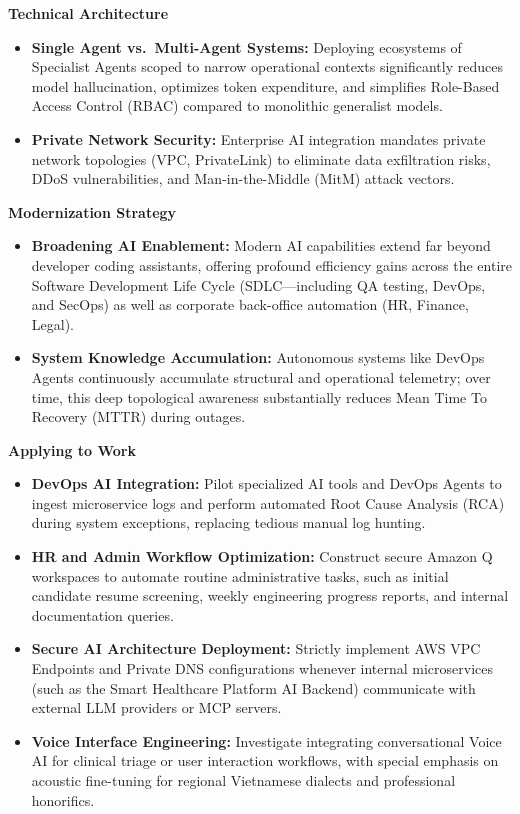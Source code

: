 \vspace{0.5em}\noindent\textbf{Technical Architecture}

\begin{itemize}
\tightlist
\item
  \textbf{Single Agent vs.~Multi-Agent Systems:} Deploying ecosystems of
  Specialist Agents scoped to narrow operational contexts significantly
  reduces model hallucination, optimizes token expenditure, and
  simplifies Role-Based Access Control (RBAC) compared to monolithic
  generalist models.
\item
  \textbf{Private Network Security:} Enterprise AI integration mandates
  private network topologies (VPC, PrivateLink) to eliminate data
  exfiltration risks, DDoS vulnerabilities, and Man-in-the-Middle (MitM)
  attack vectors.
\end{itemize}

\vspace{0.5em}\noindent\textbf{Modernization Strategy}

\begin{itemize}
\tightlist
\item
  \textbf{Broadening AI Enablement:} Modern AI capabilities extend far
  beyond developer coding assistants, offering profound efficiency gains
  across the entire Software Development Life Cycle (SDLC---including QA
  testing, DevOps, and SecOps) as well as corporate back-office
  automation (HR, Finance, Legal).
\item
  \textbf{System Knowledge Accumulation:} Autonomous systems like DevOps
  Agents continuously accumulate structural and operational telemetry;
  over time, this deep topological awareness substantially reduces Mean
  Time To Recovery (MTTR) during outages.
\end{itemize}

\vspace{0.5em}\noindent\textbf{Applying to Work}

\begin{itemize}
\tightlist
\item
  \textbf{DevOps AI Integration:} Pilot specialized AI tools and DevOps
  Agents to ingest microservice logs and perform automated Root Cause
  Analysis (RCA) during system exceptions, replacing tedious manual log
  hunting.
\item
  \textbf{HR and Admin Workflow Optimization:} Construct secure Amazon Q
  workspaces to automate routine administrative tasks, such as initial
  candidate resume screening, weekly engineering progress reports, and
  internal documentation queries.
\item
  \textbf{Secure AI Architecture Deployment:} Strictly implement AWS VPC
  Endpoints and Private DNS configurations whenever internal
  microservices (such as the Smart Healthcare Platform AI Backend)
  communicate with external LLM providers or MCP servers.
\item
  \textbf{Voice Interface Engineering:} Investigate integrating
  conversational Voice AI for clinical triage or user interaction
  workflows, with special emphasis on acoustic fine-tuning for regional
  Vietnamese dialects and professional honorifics.
\end{itemize}

